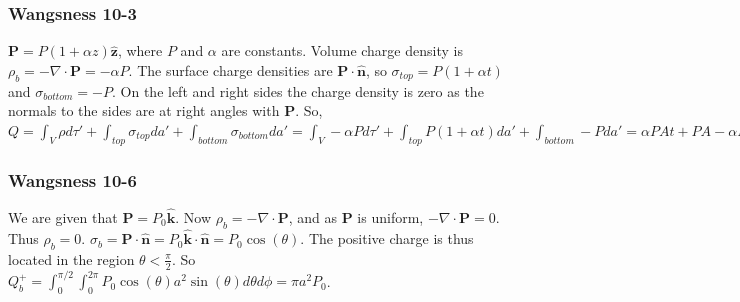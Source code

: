 \documentclass[crop=false,class=book,oneside]{standalone}
\begin{document}
            \subsubsection{Wangsness 10-3}
            $\mathbf{P}= P(1+\alpha z)\hat{\mathbf{z}}$, where $P$ and $\alpha$ are constants. Volume charge density is $\rho_{b} = -\nabla \cdot \mathbf{P} = -\alpha P$. The surface charge densities are $\mathbf{P}\cdot \hat{\mathbf{n}}$, so $\sigma_{top} = P(1+\alpha t)$ and $\sigma_{bottom} = -P$. On the left and right sides the charge density is zero as the normals to the sides are at right angles with $\mathbf{P}$. So, $Q = \int_{V} \rho d\tau' + \int_{top} \sigma_{top} da' + \int_{bottom} \sigma_{bottom} da' = \int_{V}-\alpha P d\tau' + \int_{top}P(1+\alpha t) da' + \int_{bottom} - Pda' = \alpha PAt + PA - \alpha PA t - PA = 0$
            \subsubsection{Wangsness 10-6}
            We are given that $\mathbf{P} = P_0 \hat{\mathbf{k}}$. Now $\rho_{b} = -\nabla \cdot \mathbf{P}$, and as $\mathbf{P}$ is uniform, $-\nabla \cdot \mathbf{P} = 0$. Thus $\rho_b = 0$. $\sigma_b = \mathbf{P}\cdot \hat{\mathbf{n}} = P_0 \hat{\mathbf{k}} \cdot \hat{\mathbf{n}} = P_0 \cos(\theta)$. The positive charge is thus located in the region $\theta < \frac{\pi}{2}$. So $Q_b^+ = \int_{0}^{\pi/2}\int_{0}^{2\pi} P_0 \cos(\theta) a^2 \sin(\theta) d\theta d\phi = \pi a^2 P_0$.
\end{document}
